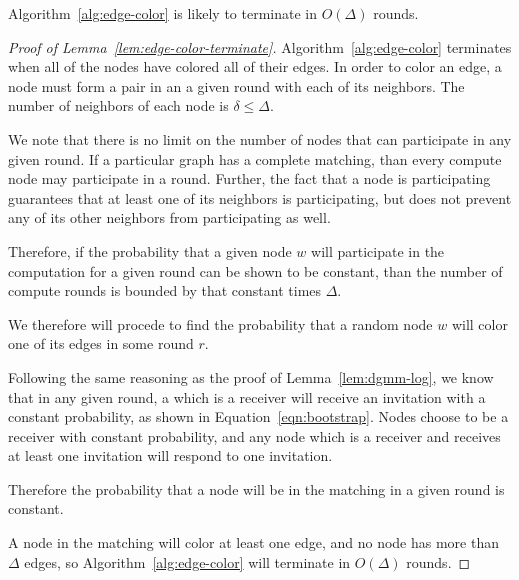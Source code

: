 \begin{lem}
\label{lem:edge-color-terminate}
Algorithm~\ref{alg:edge-color} is likely to terminate in $O(\Delta)$ rounds.
\end{lem}

\begin{proof}[Proof of Lemma~\ref{lem:edge-color-terminate}]

Algorithm~\ref{alg:edge-color} terminates when all of the nodes have colored all of their edges. In order to color an edge, a node must form a pair in an a given round with each of its neighbors. The number of neighbors of each node is $\delta \le \Delta$.

We note that there is no limit on the number of nodes that can participate in any given round. If a particular graph has a complete matching, than every compute node may participate in a round. Further, the fact that a node is participating guarantees that at least one of its neighbors is participating, but does not prevent any of its other neighbors from participating as well.

Therefore, if the probability that a given node $w$ will participate in the computation for a given round can be shown to be constant, than the number of compute rounds is bounded by that constant times $\Delta$.

We therefore will procede to find the probability that a random node $w$ will color one of its edges in some round $r$.

Following the same reasoning as the proof of Lemma~\ref{lem:dgmm-log}, we know that in any given round, a which is a receiver will receive an invitation with a constant probability, as shown in Equation~\ref{eqn:bootstrap}. Nodes choose to be a receiver with constant probability, and any node which is a receiver and receives at least one invitation will respond to one invitation.

Therefore the probability that a node will be in the matching in a given round is constant.

A node in the matching will color at least one edge, and no node has more than $\Delta$ edges, so Algorithm~\ref{alg:edge-color} will terminate in $O(\Delta)$ rounds.

\end{proof}
